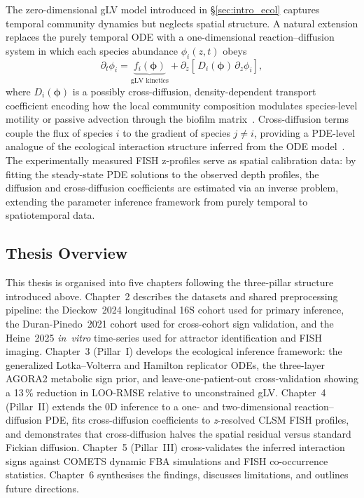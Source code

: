 The zero-dimensional gLV model introduced in \S\ref{sec:intro_ecol} captures
temporal community dynamics but neglects spatial structure.
A natural extension replaces the purely temporal ODE with a one-dimensional
reaction--diffusion system in which each species abundance $\phi_i(z,t)$ obeys
\begin{equation}
  \partial_t \phi_i
    = \underbrace{f_i(\boldsymbol{\phi})}_{\text{gLV kinetics}}
    + \partial_z\!\left[\,D_i(\boldsymbol{\phi})\,\partial_z \phi_i\right],
\end{equation}
where $D_i(\boldsymbol{\phi})$ is a possibly cross-diffusion, density-dependent
transport coefficient encoding how the local community composition modulates
species-level motility or passive advection through the biofilm
matrix~\cite{Stewart1998Diffusion, Klempt2024ContinuumGrowth, PainterHillen2002VolumeFilling}.
Cross-diffusion terms couple the flux of species $i$ to the gradient of species
$j \neq i$, providing a PDE-level analogue of the ecological interaction structure
inferred from the ODE model~\cite{Freingruber2025CrossDiffusion}.
The experimentally measured FISH z-profiles serve as spatial calibration data:
by fitting the steady-state PDE solutions to the observed depth profiles, the
diffusion and cross-diffusion coefficients are estimated via an inverse problem,
extending the parameter inference framework from purely temporal to spatiotemporal
data.

\subsection{Thesis Overview}
\label{sec:intro_overview}

This thesis is organised into five chapters following the three-pillar structure
introduced above.
Chapter~2 describes the datasets and shared preprocessing pipeline: the
Dieckow~2024 longitudinal 16S cohort used for primary inference, the
Duran-Pinedo~2021 cohort used for cross-cohort sign validation, and the Heine~2025
\textit{in~vitro} time-series used for attractor identification and FISH imaging.
Chapter~3 (Pillar~I) develops the ecological inference framework: the generalized
Lotka--Volterra and Hamilton replicator ODEs, the three-layer AGORA2 metabolic
sign prior, and leave-one-patient-out cross-validation showing a 13\,\% reduction
in LOO-RMSE relative to unconstrained gLV.
Chapter~4 (Pillar~II) extends the 0D inference to a one- and two-dimensional
reaction--diffusion PDE, fits cross-diffusion coefficients to \textit{z}-resolved
CLSM FISH profiles, and demonstrates that cross-diffusion halves the spatial
residual versus standard Fickian diffusion.
Chapter~5 (Pillar~III) cross-validates the inferred interaction signs against
COMETS dynamic FBA simulations and FISH co-occurrence statistics.
Chapter~6 synthesises the findings, discusses limitations, and outlines future
directions.

\medskip

